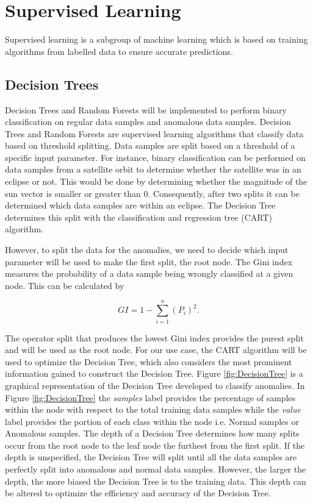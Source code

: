 \section{Supervised Learning}
Supervised learning is a subgroup of machine learning which is based on training algorithms from labelled data to ensure accurate predictions.

\subsection{Decision Trees}
Decision Trees and Random Forests will be implemented to perform binary classification on regular data samples and anomalous data samples. Decision Trees \cite{Reif2008} and Random Forests \cite{Shi2006, Paul2018, Primartha2018} are supervised learning algorithms that classify data based on threshold splitting. Data samples are split based on a threshold of a specific input parameter. For instance, binary classification can be performed on data samples from a satellite orbit to determine whether the satellite was in an eclipse or not. This would be done by determining whether the magnitude of the sun vector is smaller or greater than $0$. Consequently, after two splits it can be determined which data samples are within an eclipse. The Decision Tree determines this split with the classification and regression tree (CART) algorithm.

However, to split the data for the anomalies, we need to decide which input parameter will be used to make the first split, the root node. The Gini index measures the probability of a data sample being wrongly classified at a given node. This can be calculated by

\begin{equation}
GI = 1 - \sum_{i = 1}^{n}{(P_i)^2}.
\label{eq:Gini index}
\end{equation}

The operator split that produces the lowest Gini index provides the purest split and will be used as the root node. For our use case, the CART algorithm will be used to optimize the Decision Tree, which also considers the most prominent information gained to construct the Decision Tree. Figure \ref{fig:DecisionTree} is a graphical representation of the Decision Tree developed to classify anomalies. In Figure \ref{fig:DecisionTree} the \emph{samples} label provides the percentage of samples within the node with respect to the total training data samples while the \emph{value} label provides the portion of each class within the node i.e. Normal samples or Anomalous samples. The depth of a Decision Tree determines how many splits occur from the root node to the leaf node the furthest from the first split. If the depth is unspecified, the Decision Tree will split until all the data samples are perfectly split into anomalous and normal data samples. However, the larger the depth, the more biased the Decision Tree is to the training data. This depth can be altered to optimize the efficiency and accuracy of the Decision Tree.

